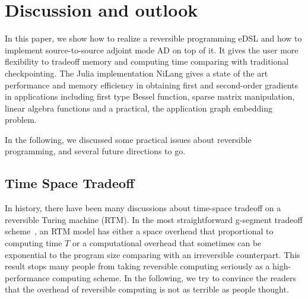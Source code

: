 \documentclass[aps,twocolumn,longbibliography,english,superscriptaddress]{revtex4-1}
\newcommand{\<}{\langle}
\renewcommand{\>}{\rangle}
\theoremstyle{definition}\newtheorem{definition}{\textit{Definition}}
\begin{document}
\section{Discussion and outlook}\label{sec:discussion}
In this paper, we show how to realize a reversible programming eDSL and how to implement source-to-source adjoint mode AD on top of it.
It gives the user more flexibility to tradeoff memory and computing time comparing with traditional checkpointing.
The Julia implementation NiLang gives a state of the art performance and memory efficiency in obtaining first and second-order gradients in applications including first type Bessel function, sparse matrix manipulation, linear algebra functions and a practical, the application graph embedding problem.

In the following, we discussed some practical issues about reversible programming, and several future directions to go.

\subsection{Time Space Tradeoff}\label{sec:timespace}
In history, there have been many discussions about time-space tradeoff on a reversible Turing machine (RTM).
In the most straightforward g-segment tradeoff scheme~\cite{Bennett1989,Levine1990}, an RTM model has either a space overhead that proportional to computing time $T$ or a computational overhead that sometimes can be exponential to the program size comparing with an irreversible counterpart.
This result stops many people from taking reversible computing seriously as a high-performance computing scheme.
In the following, we try to convince the readers that the overhead of reversible computing is not as terrible as people thought.
\end{document}
